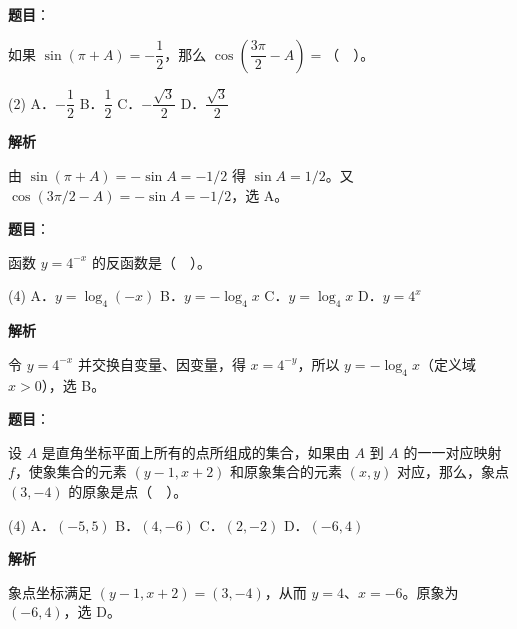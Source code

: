 \begin{answer}

\textbf{题目}：

如果 $\sin(\pi+A)=-\dfrac12$，那么 $\cos\left(\dfrac{3\pi}2-A\right)=$（　）。

\begin{gkopts}(2)
\task A．$-\dfrac12$
\task B．$\dfrac12$
\task C．$-\dfrac{\sqrt3}2$
\task D．$\dfrac{\sqrt3}2$
\end{gkopts}

\textbf{解析}

由 $\sin(\pi+A)=-\sin A=-1/2$ 得 $\sin A=1/2$。又 $\cos(3\pi/2-A)=-\sin A=-1/2$，选 A。


\end{answer}
\begin{answer}

\textbf{题目}：

函数 $y=4^{-x}$ 的反函数是（　）。

\begin{gkopts}(4)
\task A．$y=\log_4(-x)$
\task B．$y=-\log_4x$
\task C．$y=\log_4x$
\task D．$y=4^x$
\end{gkopts}

\textbf{解析}

令 $y=4^{-x}$ 并交换自变量、因变量，得 $x=4^{-y}$，所以 $y=-\log_4x$（定义域 $x>0$），选 B。


\end{answer}
\begin{answer}

\textbf{题目}：

设 $A$ 是直角坐标平面上所有的点所组成的集合，如果由 $A$ 到 $A$ 的一一对应映射 $f$，使象集合的元素 $(y-1,x+2)$ 和原象集合的元素 $(x,y)$ 对应，那么，象点 $(3,-4)$ 的原象是点（　）。

\begin{gkopts}(4)
\task A．$(-5,5)$
\task B．$(4,-6)$
\task C．$(2,-2)$
\task D．$(-6,4)$
\end{gkopts}

\textbf{解析}

象点坐标满足 $(y-1,x+2)=(3,-4)$，从而 $y=4$、$x=-6$。原象为 $(-6,4)$，选 D。


\end{answer}
